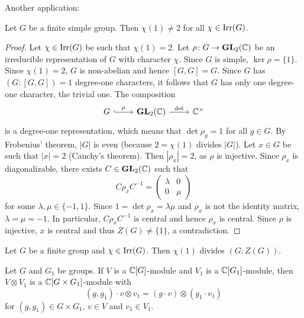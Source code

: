 Another application:

\begin{theorem}
\label{thm:simple}
    Let $G$ be a finite simple group. 
    Then $\chi(1)\ne2$ for all $\chi\in\operatorname{Irr}(G)$. 
\end{theorem}

\begin{proof}
    Let $\chi\in\operatorname{Irr}(G)$ be such that $\chi(1)=2$. Let $\rho\colon G\to\mathbf{GL}_2(\mathbb{C})$
    be an irreducible representation of $G$ with character $\chi$. Since 
    $G$ is simple, $\ker\rho=\{1\}$. Since $\chi(1)=2$, 
    $G$ is non-abelian and hence $[G,G]=G$. Since 
    $G$ has $(G:[G,G])=1$ degree-one characters, it follows that
    $G$ has only one degree-one character, the trivial one. The composition
    \[
    \begin{tikzcd}
    	G & {\GL_2(\C)} & {\C^{\times}}
    	\arrow["{\rho }", hook, from=1-1, to=1-2]
    	\arrow["{\det }", from=1-2, to=1-3]
    \end{tikzcd}
    \]
    is a degree-one representation, which means that $\det\rho_g=1$ for all $g\in G$. 
    By Frobenius' theorem, $|G|$ is even (because 
    $2=\chi(1)$ divides $|G|$). Let $x\in G$ be such that $|x|=2$ (Cauchy's theorem). 
    Then $|\rho_x|=2$, as $\rho$ is injective. Since $\rho_x$ is diagonalizable, 
    there exists $C\in\mathbf{GL}_2(\mathbb{C})$ such that
    \[
    C\rho_xC^{-1}=\begin{pmatrix}
    \lambda&0\\
    0&\mu
    \end{pmatrix}
    \]
    for some $\lambda,\mu\in\{-1,1\}$. Since $1=\det\rho_x=\lambda\mu$ and
    $\rho_x$ is not the identity matrix, $\lambda=\mu=-1$. In particular, $C\rho_xC^{-1}$ is central
    and hence $\rho_x$ is central. Since $\rho$ is injective, $x$ is central 
    and thus $Z(G)\ne\{1\}$, a contradiction. 
\end{proof}


\begin{theorem}[Schur]
\label{thm:Schur_chi(1)}
    Let $G$ be a finite group and $\chi\in\operatorname{Irr}(G)$. 
    Then $\chi(1)$ divides $(G:Z(G))$. 
\end{theorem}

Let $G$ and $G_1$ be groups. If $V$ is a $\mathbb{C}[G]$-module and 
$V_1$ is a $\mathbb{C}[G_1]$-module, then 
$V\otimes V_1$ is a $\mathbb{C}[G\times G_1]$-module 
with 
\[
(g,g_1)\cdot v\otimes v_1=(g\cdot v)\otimes (g_1\cdot v_1)
\]
for $(g,g_1)\in G\times G_1$, $v\in V$ and $v_1\in V_1$. 

